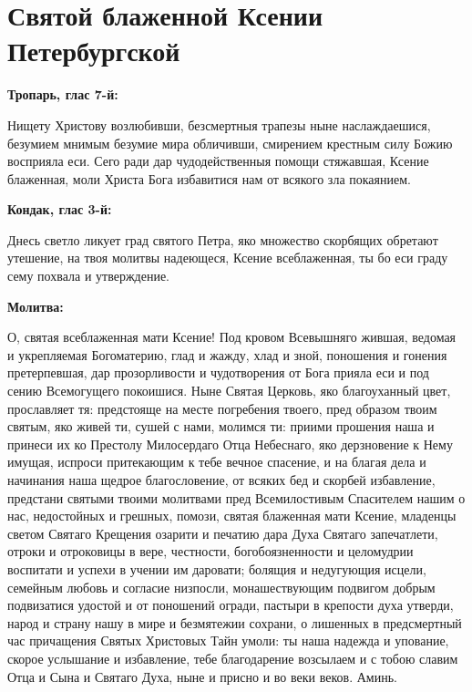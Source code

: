 \mychapterending


 

\section{Святой блаженной Ксении Петербургской}
 
\bfseries Тропарь, глас 7-й:\normalfont{}


Нищету Христову возлюбивши, безсмертныя трапезы ныне наслаждаешися, безумием мнимым безумие мира обличивши, смирением крестным силу Божию восприяла еси. Сего ради дар чудодейственныя помощи стяжавшая, Ксение блаженная, моли Христа Бога избавитися нам от всякого зла покаянием.


\medskip
\bfseries Кондак, глас 3-й:\normalfont{}


Днесь светло ликует град святого Петра, яко множество скорбящих обретают утешение, на твоя молитвы надеющеся, Ксение всеблаженная, ты бо еси граду сему похвала и утверждение.


\medskip
\bfseries Молитва:\normalfont{}


О, святая всеблаженная мати Ксение! Под кровом Всевышняго жившая, ведомая и укрепляемая Богоматерию, глад и жажду, хлад и зной, поношения и гонения претерпевшая, дар прозорливости и чудотворения от Бога прияла еси и под сению Всемогущего покоишися. Ныне Святая Церковь, яко благоуханный цвет, прославляет тя: предстояще на месте погребения твоего, пред образом твоим святым, яко живей ти, сушей с нами, молимся ти: приими прошения наша и принеси их ко Престолу Милосердаго Отца Небеснаго, яко дерзновение к Нему имущая, испроси притекающим к тебе вечное спасение, и на благая дела и начинания наша щедрое благословение, от всяких бед и скорбей избавление, предстани святыми твоими молитвами пред Всемилостивым Спасителем нашим о нас, недостойных и грешных, помози, святая блаженная мати Ксение, младенцы светом Святаго Крещения озарити и печатию дара Духа Святаго запечатлети, отроки и отроковицы в вере, честности, богобоязненности и целомудрии воспитати и успехи в учении им даровати; болящия и недугующия исцели, семейным любовь и согласие низпосли, монашествующим подвигом добрым подвизатися удостой и от поношений огради, пастыри в крепости духа утверди, народ и страну нашу в мире и безмятежии сохрани, о лишенных в предсмертный час причащения Святых Христовых Тайн умоли: ты наша надежда и упование, скорое услышание и избавление, тебе благодарение возсылаем и с тобою славим Отца и Сына и Святаго Духа, ныне и присно и во веки веков. Аминь.

